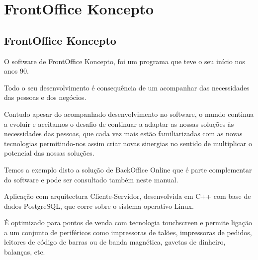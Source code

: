 \documentclass[a4paper,11pt,openany]{memoir}
\begin{document}


\part{FrontOffice Koncepto}

\chapter{FrontOffice Koncepto}

O software de FrontOffice Koncepto, foi um programa que teve o seu início nos anos 90.

Todo o seu desenvolvimento é consequência de um acompanhar das necessidades das pessoas e dos negócios.

Contudo apesar do acompanhado desenvolvimento no software, o mundo
 continua a evoluir e aceitamos o desafio de continuar a adaptar
 as nossas soluções às necessidades das pessoas, que cada vez mais
 estão familiarizadas com as novas tecnologias permitindo-nos
 assim criar novas sinergias no sentido de multiplicar o potencial das nossas soluções.


Temos a exemplo disto a solução de BackOffice Online que é parte complementar do software e pode ser consultado também neste manual.

Aplicação com arquitectura Cliente-Servidor, desenvolvida em C++ com base de dados PostgreSQL, que corre sobre o sistema operativo Linux.


É optimizado para pontos de venda com tecnologia touchscreen e permite ligação a um conjunto de periféricos como impressoras de talões, impressoras de pedidos, leitores de código de barras ou de banda magnética, gavetas de dinheiro, balanças, etc.
\end{document}
